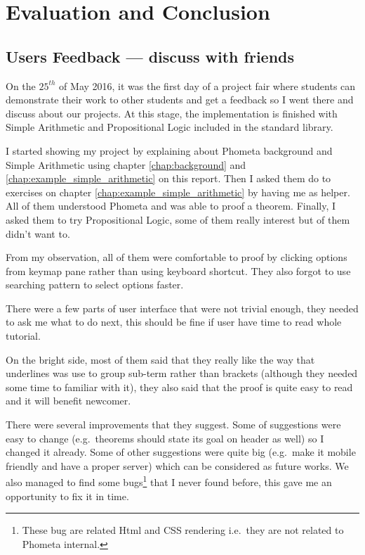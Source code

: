 \documentclass[master.tex]{subfiles}
\begin{document}
\chapter{Evaluation and Conclusion}
\label{chap:evaluation_conclusion}

\section{Users Feedback --- discuss with friends}

On the $25^{th}$ of May 2016, it was the first day of a project fair where
students can demonstrate their work to other students and get a feedback so I
went there and discuss about our projects. At this stage, the implementation is
finished with Simple Arithmetic and Propositional Logic included in the standard
library.

I started showing my project by explaining about Phometa background and Simple
Arithmetic using chapter \ref{chap:background} and
\ref{chap:example_simple_arithmetic} on this report. Then I asked them do to
exercises on chapter \ref{chap:example_simple_arithmetic} by having me as
helper. All of them understood Phometa and was able to proof a theorem. Finally,
I asked them to try Propositional Logic, some of them really interest but of
them didn't want to.

From my observation, all of them were comfortable to proof by clicking options
from keymap pane rather than using keyboard shortcut. They also forgot to use
searching pattern to select options faster.

There were a few parts of user interface that were not trivial enough, they
needed to ask me what to do next, this should be fine if user have time to read
whole tutorial.

On the bright side, most of them said that they really like the way that
underlines was use to group sub-term rather than brackets (although they needed
some time to familiar with it), they also said that the proof is quite easy to
read and it will benefit newcomer.

There were several improvements that they suggest. Some of suggestions
were easy to change (e.g.\ theorems should state its goal on header as well) so
I changed it already. Some of other suggestions were quite big (e.g.\ make it
mobile friendly and have a proper server) which can be considered as future
works. We also managed to find some bugs\footnote{These bug are
  related Html and CSS rendering i.e.\ they are not related to Phometa internal.} that I never found before,
this gave me an opportunity to fix it in time.
\end{document}
